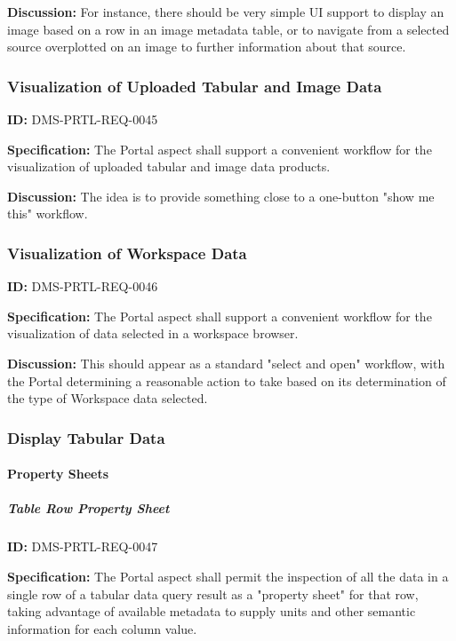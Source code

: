 \documentclass[SE,toc]{lsstdoc}
\begin{document}
\textbf{Discussion:}
For instance, there should be very simple UI support to display an image based on a row in an image metadata table, or to navigate from a selected source overplotted on an image to further information about that source.

\subsubsection{Visualization of Uploaded Tabular and Image Data}

\label{DMS-PRTL-REQ-0045}
\textbf{ID:} DMS-PRTL-REQ-0045

\textbf{Specification:}
The Portal aspect shall support a convenient workflow for the visualization of uploaded tabular and image data products.

\textbf{Discussion:}
The idea is to provide something close to a one-button "show me this" workflow.

\subsubsection{Visualization of Workspace Data}

\label{DMS-PRTL-REQ-0046}
\textbf{ID:} DMS-PRTL-REQ-0046

\textbf{Specification:}
The Portal aspect shall support a convenient workflow for the visualization of data selected in a workspace browser.

\textbf{Discussion:}
This should appear as a standard "select and open" workflow, with the Portal determining a reasonable action to take based on its determination of the type of Workspace data selected.

\subsubsection{Display Tabular Data}

\paragraph{Property Sheets}\hfill  %

\subparagraph{Table Row Property Sheet}\hfill  %

\label{DMS-PRTL-REQ-0047}
\textbf{ID:} DMS-PRTL-REQ-0047

\textbf{Specification:}
The Portal aspect shall permit the inspection of all the data in a single row of a tabular data query result as a "property sheet" for that row, taking advantage of available metadata to supply units and other semantic information for each column value.
\end{document}
